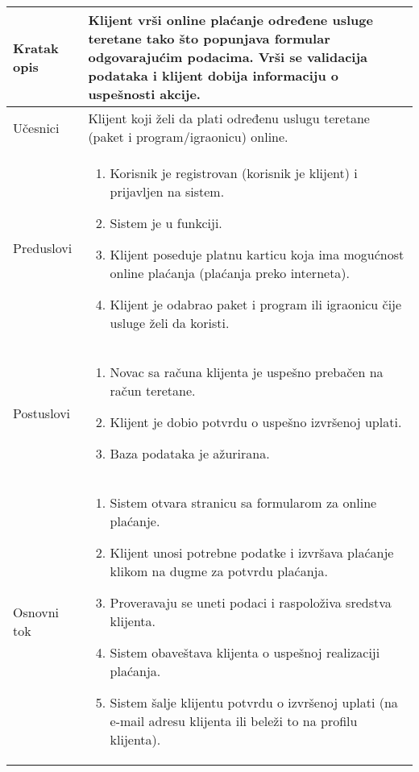 \documentclass[../main.tex]{subfiles}
\begin{document}

\begin{longtable}{| p{} | p{} |} 
\hline
    Kratak opis & Klijent vrši online plaćanje određene usluge teretane tako što popunjava formular odgovarajućim podacima. Vrši se validacija podataka i klijent dobija informaciju o uspešnosti akcije.\\ 
\hline    
    Učesnici & Klijent koji želi da plati određenu uslugu teretane (paket i program/igraonicu) online.\\
\hline
   Preduslovi & \begin{enumerate}
       \item Korisnik je registrovan (korisnik je klijent) i prijavljen na sistem.
       \item Sistem je u funkciji.
       \item Klijent poseduje platnu karticu koja ima mogućnost online plaćanja (plaćanja preko interneta).
       \item Klijent je odabrao paket i program ili igraonicu čije usluge želi da koristi.
   \end{enumerate}\\
\hline  
    Postuslovi & \begin{enumerate}
        \item Novac sa računa klijenta je uspešno prebačen na račun teretane.
		\item Klijent je dobio potvrdu o uspešno izvršenoj uplati. %
        \item Baza podataka je ažurirana.
    \end{enumerate}\\
\hline
    Osnovni tok & \begin{enumerate}
 		\item Sistem otvara stranicu sa formularom za online plaćanje.
		\item Klijent unosi potrebne podatke i izvršava plaćanje klikom na dugme za potvrdu plaćanja.
		\item Proveravaju se uneti podaci i raspoloživa sredstva klijenta.
		\item Sistem obaveštava klijenta o uspešnoj realizaciji plaćanja.
        \item Sistem šalje klijentu potvrdu o izvršenoj uplati (na e-mail adresu klijenta ili beleži to na profilu klijenta).

\end{enumerate}
\end{longtable}
\end{document}
